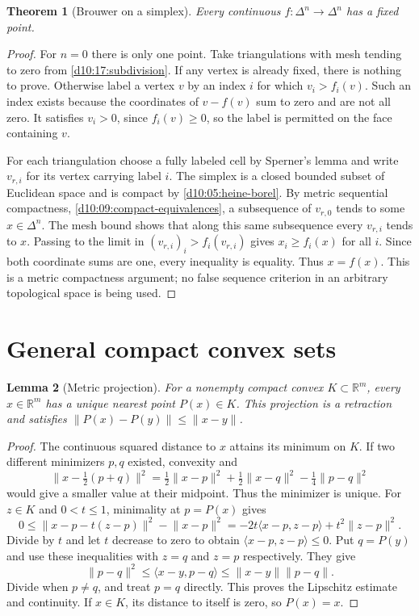 \documentclass[11pt,oneside,openany]{book}
\newtheorem{theorem}{Theorem}[chapter]
\newtheorem{lemma}[theorem]{Lemma}
\theoremstyle{definition}
\theoremstyle{remark}
\newcommand{\R}{\mathbb R}\newcommand{\C}{\mathbb C}
\newcommand{\norm}[1]{\lVert#1\rVert}
\newcommand{\ip}[2]{\langle#1,#2\rangle}
\begin{document}
\begin{theorem}[Brouwer on a simplex]\label{d10:17:brouwer-simplex}
Every continuous $f:\Delta^n\to\Delta^n$ has a fixed point.
\end{theorem}
\begin{proof}
For $n=0$ there is only one point. Take triangulations with mesh
tending to zero from \cref{d10:17:subdivision}. If any vertex is
already fixed, there is nothing to prove. Otherwise label a vertex
$v$ by an index $i$ for which $v_i>f_i(v)$. Such an index exists
because the coordinates of $v-f(v)$ sum to zero and are not all zero.
It satisfies $v_i>0$, since $f_i(v)\geq0$, so the label is
permitted on the face containing $v$.

For each triangulation choose a fully labeled cell by Sperner's lemma
and write $v_{r,i}$ for its vertex carrying label $i$.
The simplex is a closed bounded subset of Euclidean space and is
compact by \cref{d10:05:heine-borel}. By metric sequential
compactness, \cref{d10:09:compact-equivalences}, a subsequence of
$v_{r,0}$ tends to some $x\in\Delta^n$.
The mesh bound shows that along this same subsequence every
$v_{r,i}$ tends to $x$. Passing to the limit in
$(v_{r,i})_i>f_i(v_{r,i})$ gives $x_i\geq f_i(x)$ for all $i$.
Since both coordinate sums are one, every inequality is equality.
Thus $x=f(x)$. This is a metric compactness argument; no false
sequence criterion in an arbitrary topological space is being used.
\end{proof}

\section{General compact convex sets}
\begin{lemma}[Metric projection]\label{d10:17:projection}
For a nonempty compact convex $K\subset\R^m$, every $x\in\R^m$
has a unique nearest point $P(x)\in K$. This projection is a retraction
and satisfies $\norm{P(x)-P(y)}\leq\norm{x-y}$.
\end{lemma}
\begin{proof}
The continuous squared distance to $x$ attains its minimum on $K$.
If two different minimizers $p,q$ existed, convexity and
\[
 \norm{x-\tfrac12(p+q)}^2
 =\tfrac12\norm{x-p}^2+\tfrac12\norm{x-q}^2-\tfrac14\norm{p-q}^2
\]
would give a smaller value at their midpoint. Thus the minimizer is unique.
For $z\in K$ and $0<t\leq1$, minimality at $p=P(x)$ gives
\[
 0\leq \norm{x-p-t(z-p)}^2-\norm{x-p}^2
       =-2t\ip{x-p}{z-p}+t^2\norm{z-p}^2 .
\]
Divide by $t$ and let $t$ decrease to zero to obtain
$\ip{x-p}{z-p}\leq0$. Put $q=P(y)$ and use these inequalities with
$z=q$ and $z=p$ respectively. They give
\[
 \norm{p-q}^2\leq\ip{x-y}{p-q}
                 \leq\norm{x-y}\norm{p-q}.
\]
Divide when $p\ne q$, and treat $p=q$ directly. This proves the
Lipschitz estimate and continuity. If $x\in K$, its distance to
itself is zero, so $P(x)=x$.
\end{proof}
\end{document}
